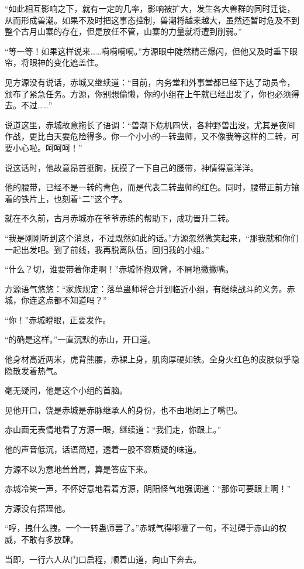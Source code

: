 \begin{this_body}
“如此相互影响之下，就有一定的几率，影响被扩大，发生各大兽群的同时迁徙，从而形成兽潮。如果不及时把这事态控制，兽潮将越来越大，虽然还暂时危及不到整个古月山寨的存在，但是放任不管，山寨的力量就将遭到削弱。”

“等一等！如果这样说来……嗬嗬嗬嗬。”方源眼中陡然精芒爆闪，但他又及时垂下眼帘，将眼神的变化遮盖住。

见方源没有说话，赤城又继续道：“目前，内务堂和外事堂都已经下达了动员令，颁布了紧急任务。方源，你别想偷懒，你的小组在上午就已经出发了，你也必须得去。不过……”

说道这里，赤城故意拖长了语调：“兽潮下危机四伏，各种野兽出没，尤其是夜间作战，更比白天要危险得多。你一个小小的一转蛊师，又不像我等这样的二转，可要小心啦。呵呵呵！”

说这话时，他故意昂首挺胸，抚摸了一下自己的腰带，神情得意洋洋。

他的腰带，已经不是一转的青色，而是代表二转蛊师的红色。同时，腰带正前方镶着的铁片上，也刻着“二”这个字。

就在不久前，古月赤城亦在爷爷赤练的帮助下，成功晋升二转。

“我是刚刚听到这个消息，不过既然如此的话。”方源忽然微笑起来，“那我就和你们一起出发吧。到了前线，我再脱离队伍，回归我的小组。”

“什么？切，谁要带着你走啊！”赤城怀抱双臂，不屑地撇撇嘴。

方源语气悠悠：“家族规定：落单蛊师将合并到临近小组，有继续战斗的义务。赤城，你连这点都不知道吗？”

“你！”赤城瞪眼，正要发作。

“的确是这样。”一直沉默的赤山，开口道。

他身材高近两米，虎背熊腰，赤裸上身，肌肉厚硬如铁。全身火红色的皮肤似乎隐隐散发着热气。

毫无疑问，他是这个小组的首脑。

见他开口，饶是赤城是赤脉继承人的身份，也不由地闭上了嘴巴。

赤山面无表情地看了方源一眼，继续道：“我们走，你跟上。”

他的声音低沉，话语简短，透着一股不容质疑的味道。

方源不以为意地耸耸肩，算是答应下来。

赤城冷笑一声，不怀好意地看着方源，阴阳怪气地强调道：“那你可要跟上啊！”

方源没有搭理他。

“哼，拽什么拽。一个一转蛊师罢了。”赤城气得嘟囔了一句，不过碍于赤山的权威，不敢有多放肆。

当即，一行六人从门口启程，顺着山道，向山下奔去。


\end{this_body}
